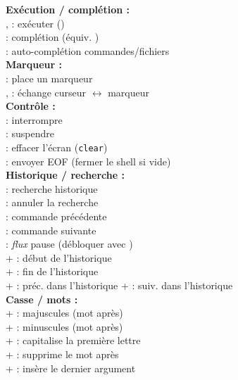 \documentclass[10pt]{article}
\begin{document}
\begin{multicols}{4}
\textbf{Exécution / complétion :}\\
,  : exécuter (\keys{\return}) \\
 : complétion (équiv. \keys{\tab}) \\
\keys{\tab}{} : auto-complétion commandes/fichiers \\[2pt]

\textbf{Marqueur :}\\
 : place un marqueur \\
, : échange curseur \(\leftrightarrow\) marqueur \\[2pt]

\textbf{Contrôle :}\\
 : interrompre \\
 : suspendre \\
 : effacer l'écran (\lstinline|clear|) \\
 : envoyer EOF (fermer le shell si vide) \\[2pt]

\textbf{Historique / recherche :}\\
 : recherche historique \\
 : annuler la recherche \\
 : commande précédente \\
 : commande suivante \\
 : \emph{flux} pause (débloquer avec ) \\
\keys{\Alt}+\keys{<} : début de l'historique \\
\keys{\Alt}+\keys{>} : fin de l'historique \\
\keys{\Alt}+ : préc. dans l'historique \quad
\keys{\Alt}+ : suiv. dans l'historique \\[2pt]

\textbf{Casse / mots :}\\
\keys{\Alt}+ : majuscules (mot après) \\
\keys{\Alt}+ : minuscules (mot après) \\
\keys{\Alt}+ : capitalise la première lettre \\
\keys{\Alt}+ : supprime le mot après \\
\keys{\Alt}+ : insère le dernier argument \\


\end{multicols}
\end{document}
